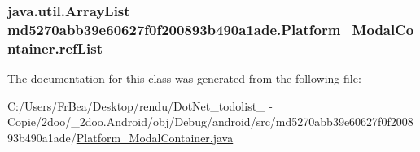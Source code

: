 \hypertarget{classmd5270abb39e60627f0f200893b490a1ade_1_1_platform___modal_container_34509ff100ef69e7caefbb3d40346429}{
\subsubsection[{refList}]{\setlength{\rightskip}{0pt plus 5cm}java.util.ArrayList {\bf md5270abb39e60627f0f200893b490a1ade.Platform\_\-ModalContainer.refList}}}
\label{classmd5270abb39e60627f0f200893b490a1ade_1_1_platform___modal_container_34509ff100ef69e7caefbb3d40346429}




The documentation for this class was generated from the following file:\begin{CompactItemize}
\item 
C:/Users/FrBea/Desktop/rendu/DotNet\_\-todolist\_ - Copie/2doo/\_\-2doo.Android/obj/Debug/android/src/md5270abb39e60627f0f200893b490a1ade/\hyperlink{_platform___modal_container_8java}{Platform\_\-ModalContainer.java}\end{CompactItemize}
